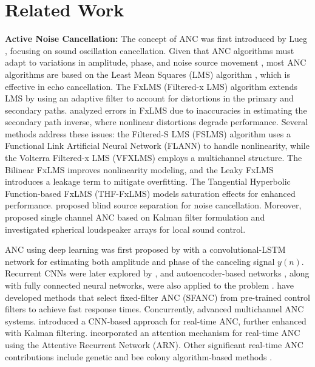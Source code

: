 \section{Related Work}
\textbf{Active Noise Cancellation:} 
The concept of ANC was first introduced by Lueg \cite{lueg1936process}, focusing on sound oscillation cancellation. Given that ANC algorithms must adapt to variations in amplitude, phase, and noise source movement \citep{nelson1991active,fuller1996active,hansen1997active,kuo1999active}, most ANC algorithms are based on the Least Mean Squares (LMS) algorithm \citep{burgess1981active}, which is effective in echo cancellation. The FxLMS (Filtered-x LMS) algorithm extends LMS by using an adaptive filter to account for distortions in the primary and secondary paths. \citet{boucher1991effect} analyzed errors in FxLMS due to inaccuracies in estimating the secondary path inverse, where nonlinear distortions degrade performance. Several methods address these issues: the Filtered-S LMS (FSLMS) \citep{das2004active} algorithm uses a Functional Link Artificial Neural Network (FLANN) \citep{patra1999identification} to handle nonlinearity, while the Volterra Filtered-x LMS (VFXLMS) \citep{tan2001adaptive} employs a multichannel structure. The Bilinear FxLMS \citep{kuo2005nonlinear} improves nonlinearity modeling, and the Leaky FxLMS \citep{tobias2005leaky} introduces a leakage term to mitigate overfitting. The Tangential Hyperbolic Function-based FxLMS (THF-FxLMS) \citep{ghasemi2016nonlinear} models saturation effects for enhanced performance. \citet{gannot2003noise} proposed blind source separation for noise cancellation. Moreover, \citet{oppenheim1994single} proposed single channel ANC based on Kalman filter formulation \citep{revach2021kalmannet} and \citet{rafaely2009spherical} investigated spherical loudspeaker arrays for local sound control.

ANC using deep learning was first proposed by \citet{zhang2021deep} with a convolutional-LSTM network for estimating both amplitude and phase of the canceling signal $y(n)$. Recurrent CNNs were later explored by \citet{park2023had,mostafavi2023deep,cha2023dnoisenet}, and autoencoder-based networks \cite{singh2024enhancing}, along with fully connected neural networks, were also applied to the problem \cite{pike2023generalized}. \citet{shi2020feedforward,shi2022selective,luo2022hybrid,park2023integrated,shi2023transferable,luo2023deep,luo2023delayless,luo2024unsupervised} have developed methods that select fixed-filter ANC (SFANC) from pre-trained control filters to achieve fast response times. Concurrently, \citet{zhu2021new,shi2022integration,zhang2023deep,shi2023multichannel,antonanzas2023remote,xiao2023spatially,zhang2023time,shi2024behind} advanced multichannel ANC systems. \citet{luo2023gfanc} introduced a CNN-based approach for real-time ANC, further enhanced with Kalman filtering. \citet{zhang2023low} incorporated an attention mechanism for real-time ANC using the Attentive Recurrent Network (ARN)\citep{pandey2022self}. Other significant real-time ANC contributions include genetic and bee colony algorithm-based methods \citep{ren2022improved, zhou2023genetic}.


